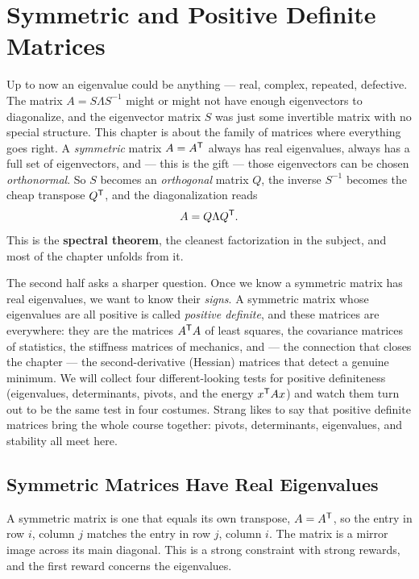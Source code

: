 \chapter{Symmetric and Positive Definite Matrices}
\label{ch:8}

Up to now an eigenvalue could be anything --- real, complex, repeated, defective. The matrix $A=S\Lambda S^{-1}$ might or might not have enough eigenvectors to diagonalize, and the eigenvector matrix $S$ was just some invertible matrix with no special structure. This chapter is about the family of matrices where everything goes right. A \emph{symmetric} matrix $A=A^{\mathsf T}$ always has real eigenvalues, always has a full set of eigenvectors, and --- this is the gift --- those eigenvectors can be chosen \emph{orthonormal}. So $S$ becomes an \emph{orthogonal} matrix $Q$, the inverse $S^{-1}$ becomes the cheap transpose $Q^{\mathsf T}$, and the diagonalization reads
\[
   A = Q\Lambda Q^{\mathsf T} .
\]
This is the \textbf{spectral theorem}, the cleanest factorization in the subject, and most of the chapter unfolds from it.

The second half asks a sharper question. Once we know a symmetric matrix has real eigenvalues, we want to know their \emph{signs}. A symmetric matrix whose eigenvalues are all positive is called \emph{positive definite}, and these matrices are everywhere: they are the matrices $A^{\mathsf T} A$ of least squares, the covariance matrices of statistics, the stiffness matrices of mechanics, and --- the connection that closes the chapter --- the second-derivative (Hessian) matrices that detect a genuine minimum. We will collect four different-looking tests for positive definiteness (eigenvalues, determinants, pivots, and the energy $x^{\mathsf T} Ax$) and watch them turn out to be the same test in four costumes. Strang likes to say that positive definite matrices bring the whole course together: pivots, determinants, eigenvalues, and stability all meet here.

\section{Symmetric Matrices Have Real Eigenvalues}

A symmetric matrix is one that equals its own transpose, $A=A^{\mathsf T}$, so the entry in row $i$, column $j$ matches the entry in row $j$, column $i$. The matrix is a mirror image across its main diagonal. This is a strong constraint with strong rewards, and the first reward concerns the eigenvalues.

